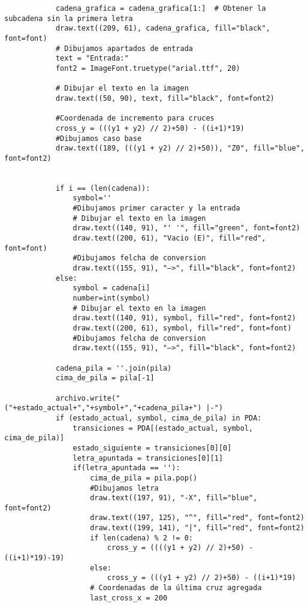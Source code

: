 \begin{lstlisting}
            cadena_grafica = cadena_grafica[1:]  # Obtener la subcadena sin la primera letra
            draw.text((209, 61), cadena_grafica, fill="black", font=font)
            # Dibujamos apartados de entrada
            text = "Entrada:"
            font2 = ImageFont.truetype("arial.ttf", 20)

            # Dibujar el texto en la imagen
            draw.text((50, 90), text, fill="black", font=font2)
            
            #Coordenada de incremento para cruces
            cross_y = (((y1 + y2) // 2)+50) - ((i+1)*19)
            #Dibujamos caso base
            draw.text((189, (((y1 + y2) // 2)+50)), "Z0", fill="blue", font=font2)
            
            
            if i == (len(cadena)):
                symbol=''
                #Dibujamos primer caracter y la entrada
                # Dibujar el texto en la imagen
                draw.text((140, 91), "' '", fill="green", font=font2)
                draw.text((200, 61), "Vacio (E)", fill="red", font=font)
                #Dibujamos felcha de conversion
                draw.text((155, 91), "—>", fill="black", font=font2)
            else:
                symbol = cadena[i]
                number=int(symbol)
                # Dibujar el texto en la imagen
                draw.text((140, 91), symbol, fill="red", font=font2)
                draw.text((200, 61), symbol, fill="red", font=font)
                #Dibujamos felcha de conversion
                draw.text((155, 91), "—>", fill="black", font=font2)
                
            cadena_pila = ''.join(pila)
            cima_de_pila = pila[-1]
            
            archivo.write("("+estado_actual+","+symbol+","+cadena_pila+") |-")
            if (estado_actual, symbol, cima_de_pila) in PDA:
                transiciones = PDA[(estado_actual, symbol, cima_de_pila)]
                estado_siguiente = transiciones[0][0]  
                letra_apuntada = transiciones[0][1]
                if(letra_apuntada == ''):
                    cima_de_pila = pila.pop()
                    #Dibujamos letra
                    draw.text((197, 91), "-X", fill="blue", font=font2)
                    draw.text((197, 125), "^", fill="red", font=font2)
                    draw.text((199, 141), "|", fill="red", font=font2)
                    if len(cadena) % 2 != 0:
                        cross_y = ((((y1 + y2) // 2)+50) - ((i+1)*19)-19)
                    else:
                        cross_y = (((y1 + y2) // 2)+50) - ((i+1)*19)
                    # Coordenadas de la última cruz agregada
                    last_cross_x = 200
                    

\end{lstlisting}
